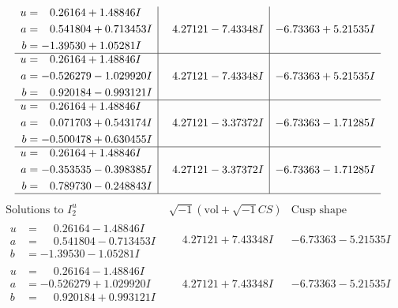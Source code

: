 \documentclass[1p]{elsarticle_modified}
\theoremstyle{definition}
\newcommand{\I}{\sqrt{-1}}
\begin{document}
$$\begin{array}{c|c|c}
\begin{aligned}
u &= \phantom{-}0.26164 + 1.48846 I \\
a &= \phantom{-}0.541804 + 0.713453 I \\
b &= -1.39530 + 1.05281 I\end{aligned}
 & \phantom{-}4.27121 - 7.43348 I & -6.73363 + 5.21535 I \\ \hline\begin{aligned}
u &= \phantom{-}0.26164 + 1.48846 I \\
a &= -0.526279 - 1.029920 I \\
b &= \phantom{-}0.920184 - 0.993121 I\end{aligned}
 & \phantom{-}4.27121 - 7.43348 I & -6.73363 + 5.21535 I \\ \hline\begin{aligned}
u &= \phantom{-}0.26164 + 1.48846 I \\
a &= \phantom{-}0.071703 + 0.543174 I \\
b &= -0.500478 + 0.630455 I\end{aligned}
 & \phantom{-}4.27121 - 3.37372 I & -6.73363 - 1.71285 I \\ \hline\begin{aligned}
u &= \phantom{-}0.26164 + 1.48846 I \\
a &= -0.353535 - 0.398385 I \\
b &= \phantom{-}0.789730 - 0.248843 I\end{aligned}
 & \phantom{-}4.27121 - 3.37372 I & -6.73363 - 1.71285 I\\
 \hline 
 \end{array}$$\newpage$$\begin{array}{c|c|c}  
\text{Solutions to }I^u_{2}& \I (\text{vol} + \sqrt{-1}CS) & \text{Cusp shape}\\
 \hline 
\begin{aligned}
u &= \phantom{-}0.26164 - 1.48846 I \\
a &= \phantom{-}0.541804 - 0.713453 I \\
b &= -1.39530 - 1.05281 I\end{aligned}
 & \phantom{-}4.27121 + 7.43348 I & -6.73363 - 5.21535 I \\ \hline\begin{aligned}
u &= \phantom{-}0.26164 - 1.48846 I \\
a &= -0.526279 + 1.029920 I \\
b &= \phantom{-}0.920184 + 0.993121 I\end{aligned}
 & \phantom{-}4.27121 + 7.43348 I & -6.73363 - 5.21535 I \\ \hline\begin{aligned}

\end{aligned}
\end{array}$$
\end{document}
